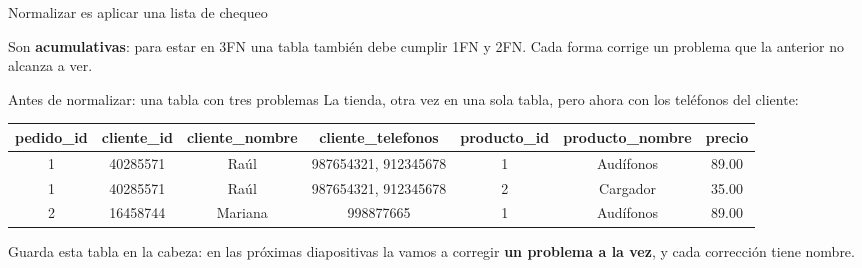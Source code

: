 \documentclass[aspectratio=169,10pt,c]{beamer}
\newenvironment{tablaventa}{\footnotesize\setlength\tabcolsep{4.5pt}}{}
\newcommand{\fn}[1]{\tikz[baseline=-0.5ex]{\node[rounded corners=2pt,fill=utpRojo,text=white,
  font=\bfseries\small,inner xsep=6pt,inner ysep=3pt] {#1};}}
\begin{document}
\begin{frame}{Normalizar es aplicar una lista de chequeo}
\vspace{0.3cm}
\begin{center}
\end{center}
\vspace{0.3cm}
\small Son \textbf{acumulativas}: para estar en 3FN una tabla también debe cumplir 1FN y 2FN. Cada forma corrige un problema que la anterior no alcanza a ver.
\vspace{0.25cm}
\end{frame}

\begin{frame}{Antes de normalizar: una tabla con tres problemas}
\small La tienda, otra vez en una sola tabla, pero ahora con los teléfonos del cliente:
\vspace{0.2cm}
\begin{center}
\begin{tablaventa}
\begin{tabular}{ccccccc}
\toprule
\bfseries pedido\_id & \bfseries cliente\_id & \bfseries cliente\_nombre & \bfseries cliente\_telefonos & \bfseries producto\_id & \bfseries producto\_nombre & \bfseries precio \\
\midrule
1 & 40285571 & Raúl & 987654321, 912345678 & 1 & Audífonos & 89.00 \\
1 & 40285571 & Raúl & 987654321, 912345678 & 2 & Cargador  & 35.00 \\
2 & 16458744 & Mariana & 998877665 & 1 & Audífonos & 89.00 \\
\bottomrule
\end{tabular}
\end{tablaventa}
\end{center}
\vspace{0.35cm}
\small Guarda esta tabla en la cabeza: en las próximas diapositivas la vamos a corregir \textbf{un problema a la vez}, y cada corrección tiene nombre.
\end{frame}
\end{document}
